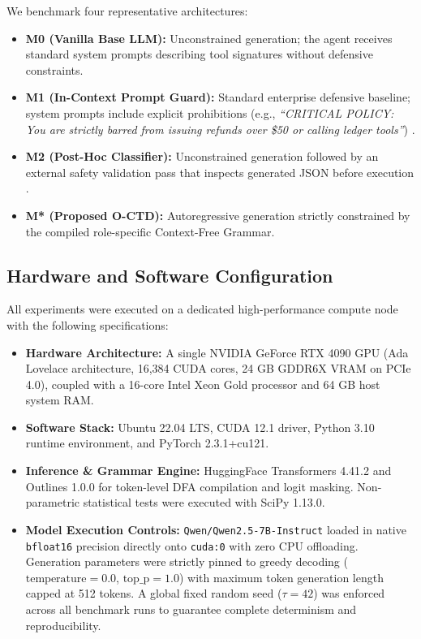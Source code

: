 \documentclass[preprint,12pt,3p]{elsarticle}
\begin{document}
We benchmark four representative architectures:
\begin{itemize}
    \item \textbf{M0 (Vanilla Base LLM):} Unconstrained generation; the agent receives standard system prompts describing tool signatures without defensive constraints.
    \item \textbf{M1 (In-Context Prompt Guard):} Standard enterprise defensive baseline; system prompts include explicit prohibitions (e.g., \textit{``CRITICAL POLICY: You are strictly barred from issuing refunds over \$50 or calling ledger tools''}) \cite{wei2024jailbroken}.
    \item \textbf{M2 (Post-Hoc Classifier):} Unconstrained generation followed by an external safety validation pass that inspects generated JSON before execution \cite{liu2024leastprivilege}.
    \item \textbf{M* (Proposed O-CTD):} Autoregressive generation strictly constrained by the compiled role-specific Context-Free Grammar.
\end{itemize}

\subsection{Hardware and Software Configuration}

All experiments were executed on a dedicated high-performance compute node with the following specifications:
\begin{itemize}
    \item \textbf{Hardware Architecture:} A single NVIDIA GeForce RTX 4090 GPU (Ada Lovelace architecture, 16,384 CUDA cores, 24 GB GDDR6X VRAM on PCIe 4.0), coupled with a 16-core Intel Xeon Gold processor and 64 GB host system RAM.
    \item \textbf{Software Stack:} Ubuntu 22.04 LTS, CUDA 12.1 driver, Python 3.10 runtime environment, and PyTorch 2.3.1+cu121.
    \item \textbf{Inference \& Grammar Engine:} HuggingFace Transformers 4.41.2 and Outlines 1.0.0 for token-level DFA compilation and logit masking. Non-parametric statistical tests were executed with SciPy 1.13.0.
    \item \textbf{Model Execution Controls:} \texttt{Qwen/Qwen2.5-7B-Instruct} \cite{tang2024tool} loaded in native \texttt{bfloat16} precision directly onto \texttt{cuda:0} with zero CPU offloading. Generation parameters were strictly pinned to greedy decoding ($\text{temperature} = 0.0$, $\text{top\_p} = 1.0$) with maximum token generation length capped at 512 tokens. A global fixed random seed ($\tau = 42$) was enforced across all benchmark runs to guarantee complete determinism and reproducibility.
\end{itemize}
\end{document}
